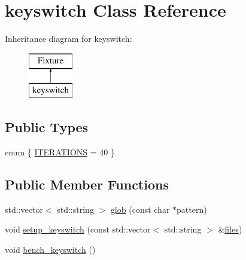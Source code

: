 \hypertarget{classkeyswitch}{\section{keyswitch Class Reference}
\label{classkeyswitch}
}
Inheritance diagram for keyswitch\-:\begin{figure}[H]
\begin{center}
\leavevmode
\includegraphics[height=2.000000cm]{classkeyswitch}
\end{center}
\end{figure}
\subsection*{Public Types}
\begin{DoxyCompactItemize}
\item 
enum \{ \hyperlink{classkeyswitch_a44b4c789ec6ac14a37624f4cc5c36311af27c28f98028462aafb3baf3acf2e401}{I\-T\-E\-R\-A\-T\-I\-O\-N\-S} = 40
 \}
\end{DoxyCompactItemize}
\subsection*{Public Member Functions}
\begin{DoxyCompactItemize}
\item 
std\-::vector$<$ std\-::string $>$ \hyperlink{classkeyswitch_a57db49fef33a51c209d8797f2dc43ab9}{glob} (const char $\ast$pattern)
\item 
void \hyperlink{classkeyswitch_a2ab9c474f05db3da844fd06672b7ef4c}{setup\-\_\-keyswitch} (const std\-::vector$<$ std\-::string $>$ \&\hyperlink{bench__keyswitch_8cpp_a37dfb1be7add7ba7d1ec65c8ab64c88b}{files})
\item 
void \hyperlink{classkeyswitch_a929b0b812b0e43dcee02a7223ad65da1}{bench\-\_\-keyswitch} ()
\end{DoxyCompactItemize}


